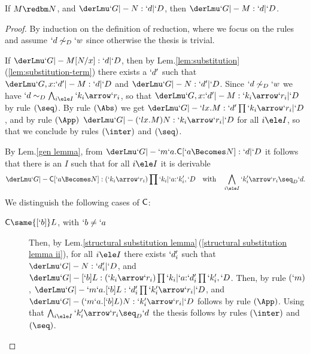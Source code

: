 \documentclass{CSML}
\begin{document}
 \begin{thm} \label{Subject expansion} 
If $M \redbm N$, and $ \derLmu `G |- N : `d | `D $, then $ \derLmu `G |- M : `d | `D $.
 \end{thm}
 \begin{proof} %
By induction on the definition of reduction, 
where we focus on the rules and assume $`d \not\sim_D `w$ since otherwise the thesis is trivial.

 \begin{description} \itemsep 2pt

 \item [{$ (`l x . M ) N \red M [ N /x ] $}]
If $ \derLmu `G |- M[N/x] : `d | `D $, then by Lem.\skp\ref{lem:substitution}\skp(\ref{lem:substitution-term}) there exists a $`d'$ such that 
$ \derLmu `G,x{:}`d' |- M : `d | `D $ and $ \derLmu `G |- N : `d' | `D $. Since $`d \not\sim_D `w$ 
we have $`d \sim_D \bigwedge_{i\ele I} `k_i\arrow `r_i$, so that
$ \derLmu `G,x{:}`d' |- M : `k_i\arrow `r_i | `D $ by rule $(\seq)$. By rule $(\Abs)$ we get
$ \derLmu `G |- `l x.M : `d'\prod `k_i\arrow `r_i | `D $, and by rule $(\App)$ 
$ \derLmu `G |- (`l x.M)N : `k_i\arrow `r_i | `D $ for all $i\ele I$, so that we conclude by rules $(\inter)$ and $(\seq)$.



 \item [{$ (`m `a . {\Cmd} ) N \red `m `a . {\Cmd} [ `a \Becomes N ] $}]
By Lem.\skp\ref{gen lemma}, from $\derLmu `G |- {`m `a . \Cmd[ `a \Becomes N ]} : `d | `D $ it follows that there is an $I$ 
such that for all $i\ele I$ it is derivable
 \[\derLmu `G |- {{\Cmd}[ `a \Becomes N ]} : (`k_i\arrow `r_i)\prod `k_i | `a{:}`k'_i ,`D \quad \text{with} \quad
 \bigwedge_{i\ele I} `k'_i\arrow `r_i \seq_D `d.\]
We distinguish the following cases of $\textrm{\sf C}$:

 \begin{description}

 \item [$ \Cmd \same {[`b]}L$, with $`b \neq `a $] 
Then, by Lem.\skp\ref{structural substitution lemma}\,(\ref{structural substitution lemma ii}), for all $i\ele I$
there exists $`d'_i$ such that 
$\derLmu `G |- N : `d'_i | `D $, and $ \derLmu `G |- {{[`b]}L} : (`k_i\arrow `r_i)\prod `k_i | `a{:}`d'_i\prod `k'_i,`D $.
Then, by rule $(`m)$, $ \derLmu `G |- `m`a.{{[`b]}L} : `d'_i\prod `k'_i\arrow `r_i | `D $, and 
$ \derLmu `G |- (`m`a.{{[`b]}L})N : `k'_i\arrow `r_i | `D $ follows by rule $(\App)$. Using that 
$ \bigwedge_{i\ele I} `k'_i\arrow `r_i \seq_D `d$ the thesis follows by rules $(\inter)$ and $(\seq)$.




\end{description}
\end{description}
\end{proof}
\end{document}
